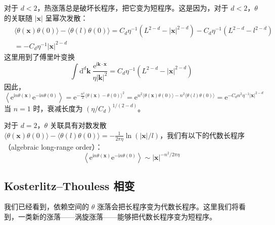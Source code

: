 对于 $d<2$，热涨落总是破坏长程序，把它变为短程序。这是因为，对于 $d<2$，$\theta$ 的关联随 $|\pmb{x}|$ 呈幂次发散：
\begin{equation*}
\begin{aligned}
&\ \langle \theta(\pmb{x})\theta(0)\rangle - \langle \theta(l)\theta(0)\rangle
 = C_{d}\eta^{-1}(L^{2-d} - |\pmb{x}|^{2-d}) - C_{d}\eta^{-1}(L^{2-d} - l^{2-d}) \\
&\ = -C_{d}\eta^{-1}|\pmb{x}|^{2-d}
\end{aligned}
\end{equation*}
这里用到了傅里叶变换
\begin{equation*}
\int \mathrm{d}^{d}\pmb{k}\ \frac{\mathrm{e}^{\mathrm{i}\pmb{k}\cdot\pmb{x}}}{\eta|\pmb{k}|^{2}} = C_{d}\eta^{-1}(L^{2-d} - |\pmb{x}|^{2-d})
\end{equation*}
因此，
\begin{equation*}
\left\langle \mathrm{e}^{\mathrm{i}n\theta(\pmb{x})}\mathrm{e}^{-\mathrm{i}n\theta(0)} \right\rangle
= \mathrm{e}^{-\frac{n^{2}}{2}\langle \theta(\pmb{x})-\theta(0)\rangle^{2}}
= \mathrm{e}^{n^{2}\langle \theta(\pmb{x})\theta(0)\rangle - n^{2}\langle \theta(l)\theta(0)\rangle}
= \mathrm{e}^{-C_{d}n^{2}\eta^{-1}|\pmb{x}|^{2-d}}
\end{equation*}
当 $n=1$ 时，衰减长度为 $(\eta/C_{d})^{1/(2-d)}$。

对于 $d=2$，$\theta$ 关联具有对数发散 $\langle \theta(\pmb{x})\theta(0)\rangle - \langle \theta(l)\theta(0)\rangle = -\frac{1}{2\pi\eta}\ln(|\pmb{x}|/l)$，我们有以下的代数长程序（algebraic long-range order）：
\begin{equation*}
\left\langle \mathrm{e}^{\mathrm{i}n\theta(\pmb{x})}\mathrm{e}^{-\mathrm{i}n\theta(0)} \right\rangle \sim |\pmb{x}|^{-n^{2}/2\pi\eta}
\tag{3.4.4}
\end{equation*}


\subsection{Kosterlitz--Thouless 相变}
\begin{keypoints}
\item 我们已经看到，依赖空间的 $\theta$ 涨落会把长程序变为代数长程序。这里我们将看到，一类新的涨落——涡旋涨落——能够把代数长程序变为短程序。
\end{keypoints}

